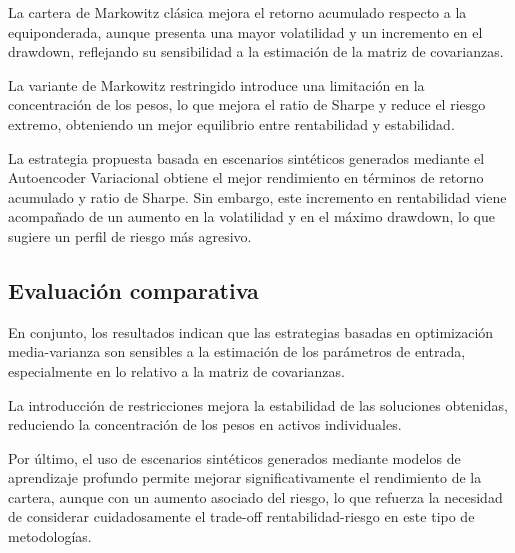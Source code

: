 La cartera de Markowitz clásica mejora el retorno acumulado respecto a la equiponderada, aunque presenta una mayor volatilidad y un incremento en el drawdown, reflejando su sensibilidad a la estimación de la matriz de covarianzas.

La variante de Markowitz restringido introduce una limitación en la concentración de los pesos, lo que mejora el ratio de Sharpe y reduce el riesgo extremo, obteniendo un mejor equilibrio entre rentabilidad y estabilidad.

La estrategia propuesta basada en escenarios sintéticos generados mediante el Autoencoder Variacional obtiene el mejor rendimiento en términos de retorno acumulado y ratio de Sharpe. Sin embargo, este incremento en rentabilidad viene acompañado de un aumento en la volatilidad y en el máximo drawdown, lo que sugiere un perfil de riesgo más agresivo.

\subsection{Evaluación comparativa}

En conjunto, los resultados indican que las estrategias basadas en optimización media-varianza son sensibles a la estimación de los parámetros de entrada, especialmente en lo relativo a la matriz de covarianzas.

La introducción de restricciones mejora la estabilidad de las soluciones obtenidas, reduciendo la concentración de los pesos en activos individuales.

Por último, el uso de escenarios sintéticos generados mediante modelos de aprendizaje profundo permite mejorar significativamente el rendimiento de la cartera, aunque con un aumento asociado del riesgo, lo que refuerza la necesidad de considerar cuidadosamente el trade-off rentabilidad-riesgo en este tipo de metodologías.
